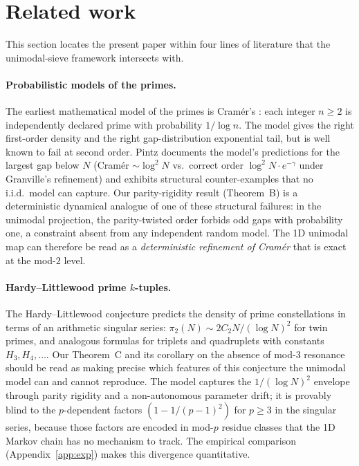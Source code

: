 
\section{Related work}
\label{sec:related}

This section locates the present paper within four lines of literature
that the unimodal-sieve framework intersects with.

\paragraph{Probabilistic models of the primes.}
The earliest mathematical model of the primes is Cram\'er's
\cite{cramer1936order}: each integer $n \geq 2$ is independently
declared prime with probability $1/\log n$. The model gives the right
first-order density and the right gap-distribution exponential tail,
but is well known to fail at second order. Pintz \cite{pintz2007cramer}
documents the model's predictions for the largest gap below $N$
(Cram\'er $\sim \log^2 N$ vs.\ correct order $\log^2 N \cdot e^{-\gamma}$
under Granville's refinement) and exhibits structural counter-examples
that no i.i.d.\ model can capture. Our parity-rigidity result
(Theorem~B) is a deterministic dynamical analogue of one of these
structural failures: in the unimodal projection, the parity-twisted
order forbids odd gaps with probability one, a constraint absent from
any independent random model. The 1D unimodal map can therefore be
read as a \emph{deterministic refinement of Cram\'er} that is exact at
the mod-$2$ level.

\paragraph{Hardy--Littlewood prime $k$-tuples.}
The Hardy--Littlewood conjecture \cite{hardy1923some} predicts the
density of prime constellations in terms of an arithmetic singular
series: $\pi_2(N) \sim 2 C_2 N / (\log N)^2$ for twin primes, and
analogous formulas for triplets and quadruplets with constants $H_3, H_4, \ldots$.
Our Theorem~C and its corollary on the absence of mod-$3$ resonance
should be read as making precise which features of this conjecture the
unimodal model can and cannot reproduce. The model captures the
$1/(\log N)^2$ envelope through parity rigidity and a non-autonomous
parameter drift; it is provably blind to the $p$-dependent factors
$(1 - 1/(p-1)^2)$ for $p \geq 3$ in the singular series, because those
factors are encoded in mod-$p$ residue classes that the 1D Markov
chain has no mechanism to track. The empirical comparison
(Appendix~\ref{app:exp}) makes this divergence quantitative.

